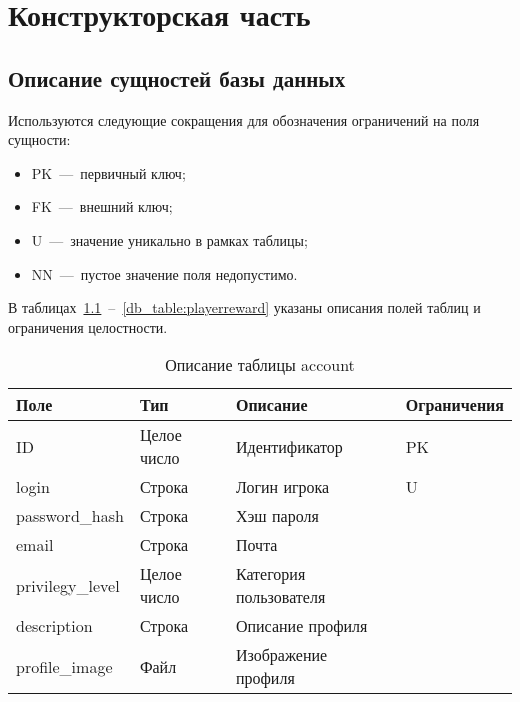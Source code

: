 \chapter{Конструкторская часть}

\section{Описание сущностей базы данных}

Используются следующие сокращения для обозначения ограничений на поля сущности:
\begin{itemize}
	\item PK~---~первичный ключ;
	\item FK~---~внешний ключ;
	\item U~---~значение уникально в рамках таблицы;
	\item NN~---~пустое значение поля недопустимо.
\end{itemize}

В таблицах~\ref{db_table:account}~--~\ref{db_table:playerreward} указаны описания полей таблиц и ограничения целостности. 

\newenvironment{dbtable}[2]{
\begin{table}[h!]
	\caption{\label{db_table:#1} #2 }
	\begin{tabular}{|p{3cm}|p{3cm}|p{6cm}|p{3cm}|}
	\hline
	Поле & Тип & Описание & Ограничения \\\hline
}
{
\end{tabular}
\end{table}
}

\begin{dbtable}{account}{Описание таблицы account}
	ID & Целое число & Идентификатор & PK \\\hline
	login & Строка & Логин игрока & U \\\hline
	password\_hash & Строка & Хэш пароля & \\\hline
	email & Строка & Почта & \\\hline
	privilegy\_level & Целое число & Категория пользователя &\\\hline
	description & Строка & Описание профиля &\\\hline
	profile\_image & Файл & Изображение профиля &\\\hline

\end{dbtable}

